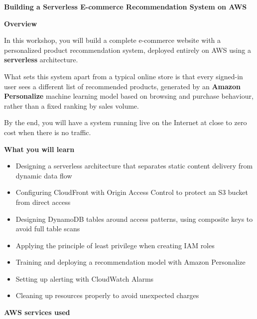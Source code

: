 \vspace{0.5em}\noindent\textbf{Building a Serverless E-commerce Recommendation System on
AWS}\par

\vspace{0.5em}\noindent\textbf{Overview}\par

In this workshop, you will build a complete e-commerce website with a
personalized product recommendation system, deployed entirely on AWS
using a \textbf{serverless} architecture.

What sets this system apart from a typical online store is that every
signed-in user sees a different list of recommended products, generated
by an \textbf{Amazon Personalize} machine learning model based on
browsing and purchase behaviour, rather than a fixed ranking by sales
volume.

By the end, you will have a system running live on the Internet at close
to zero cost when there is no traffic.

\vspace{0.5em}\noindent\textbf{What you will learn}\par

\begin{itemize}
\tightlist
\item
  Designing a serverless architecture that separates static content
  delivery from dynamic data flow
\item
  Configuring CloudFront with Origin Access Control to protect an S3
  bucket from direct access
\item
  Designing DynamoDB tables around access patterns, using composite keys
  to avoid full table scans
\item
  Applying the principle of least privilege when creating IAM roles
\item
  Training and deploying a recommendation model with Amazon Personalize
\item
  Setting up alerting with CloudWatch Alarms
\item
  Cleaning up resources properly to avoid unexpected charges
\end{itemize}

\vspace{0.5em}\noindent\textbf{AWS services used}\par


